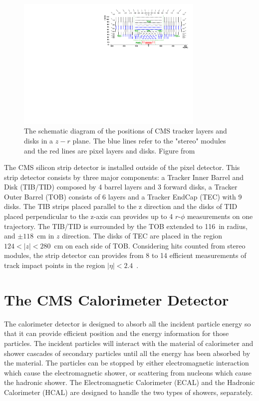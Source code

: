 \begin{figure}[ht]
  \begin{center}
    \includegraphics[width=0.8\textwidth]{figures/detector/TrackerLayoutNew.pdf}
  \end{center}
  \caption{The schematic diagram of the positions of CMS tracker layers and disks in a $z-r$ plane. The blue lines refer to the "stereo" modules and the red lines are pixel layers and disks. Figure from~\cite{Chatrchyan:2014fea}}
  \label{fig:cms_tracker}
\end{figure}

The CMS silicon strip detector is installed outside of the pixel detector. This strip detector consists by three major components: a Tracker Inner Barrel and Disk (TIB/TID) composed by 4 barrel layers and 3 forward disks, a Tracker Outer Barrel (TOB) consists of 6 layers and a Tracker EndCap (TEC) with 9 disks. The TIB strips placed parallel to the z direction and the disks of TID placed perpendicular to the z-axis can provides up to 4 $r$-$\phi$ measurements on one trajectory. The TIB/TID is surrounded by the TOB extended to 116~\cm in radius, and $\pm118$~cm in $z$ direction. The disks of TEC are placed in the region $124<|z|<280$~cm on each side of TOB. Considering hits counted from stereo modules, the strip detector can provides from 8 to 14 efficient measurements of track impact points in the region $|\eta|<2.4$~\cite{CMS:2010yua}.

\section{The CMS Calorimeter Detector}

The calorimeter detector is designed to absorb all the incident particle energy so that it can provide efficient position and the energy information for those particles. The incident particles will interact with the material of calorimeter and shower cascades of secondary particles until all the energy has been absorbed by the material. The particles can be stopped by either electromagnetic interaction which cause the electromagnetic shower, or scattering from nucleons which cause the hadronic shower. The Electromagnetic Calorimeter (ECAL) and the Hadronic Calorimeter (HCAL) are designed to handle the two types of showers, separately. 


